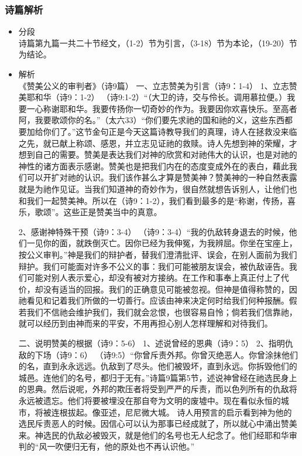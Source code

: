 \subsubsection{诗篇解析}
\begin{itemize}
\item 分段\\
诗篇第九篇一共二十节经文，（1-2）节为引言，（3-18）节为本论，（19-20）节为结论。

\item 解析\\
《赞美公义的审判者》（诗9篇）
一、立志赞美为引言（诗9：1-4）
1、立志赞美耶和华（诗9：1-2） 
（诗9:1-2）“（大卫的诗，交与伶长。调用慕拉便。）我要一心称谢耶和华。我要传扬你一切奇妙的作为。我要因你欢喜快乐。至高者阿，我要歌颂你的名。”（太六33）“你们要先求祂的国和祂的义，这些东西都要加给你们了。”这节金句正是今天这篇诗教导我们的真理，诗人在拯救没来临之先，就已献上称颂、感恩，并立志见证祂的救赎。诗人先想到神的荣耀，才想到自己的需要。赞美是表达我们对神的欣赏和对祂伟大的认识，也是对祂的神性的诸方面表示感谢。赞美也是把我们内在的态度变成外在的表白，藉此我们可以开扩对祂的认识。我们该作甚么才算是赞美神？赞美神的一种自然表露就是为祂作见证。当我们知道神的奇妙作为，很自然就想告诉别人，让他们也和我们一起赞美神。所以在（诗9：1-2），我们看到最多的是“称谢，传扬，喜乐，歌颂”。这些正是赞美当中的真意。

2、感谢神特殊干预（诗9：3-4）
（诗9：3-4）“我的仇敌转身退去的时候，他们一见你的面，就跌倒灭亡。因你已经为我伸冤，为我辨屈。你坐在宝座上，按公义审判。”神是我们的辩护者，替我们澄清批评、误会，在别人面前为我们辩护。我们可能面对许多不公义的事：我们可能被朋友误会，被仇敌诬告。我们可能对别人表示爱心，却没有被对方接纳。在工作和事奉上真正付上了代价，却没有适当的回报。我们的正确意见可能被忽视。但神是值得称赞的，因祂看见和记着我们所做的一切善行。应该由神来决定何时给我们何种报酬。假若我们不信祂会维护我们，我们就会忿恨，也很容易自怜；倘若我们信靠祂，就可以经历到由神而来的平安，不用再担心别人怎样理解和对待我们。

二、说明赞美的根据（诗9：5-6）
1、述说曾经的恩典（诗9：5）
2、指明仇敌的下场（诗9：6）
（诗9:5）“你曾斥责外邦。你曾灭绝恶人。你曾涂抹他们的名，直到永永远远。仇敌到了尽头。他们被毁坏，直到永远。你拆毁他们的城邑。连他们的名号，都归于无有。”诗篇9篇第5节，述说神曾经在祂选民身上的恩典。然后说呢，外邦的欺压者将受到严严的斥责，而以色列所有的仇敌将永远被遗忘。他们将要被埋没在那自夸为文明的废墟中。现在看似永恒的城市，将被连根拔起。像亚述，尼尼微大城。 诗人用预言的启示看到神为他的选民斥责恶人的时候。因信心可以认为那事已经成就了，所以就心中涌出赞美来。神选民的仇敌必被毁灭，就是他们的名号也无人纪念了。他们经耶和华审判的“风一吹便归无有，他的原处也不再认识他。”


\end{itemize}
